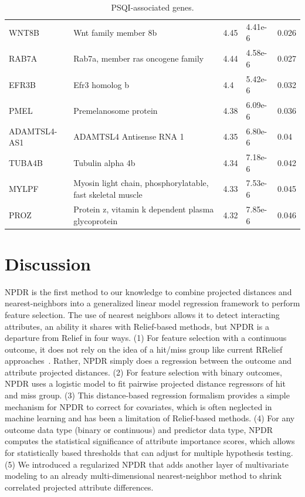 \documentclass[10pt]{article}
\begin{document}
\begin{table}[]
\begin{tabular}{p{1.8cm}p{6.8cm}C{1cm}C{1.3cm}C{1.7cm}}
WNT8B    & Wnt family member 8b                                       & 4.45          & 4.41e-6       & 0.026          \\
RAB7A    & Rab7a, member ras oncogene family                          & 4.44          & 4.58e-6       & 0.027          \\
EFR3B    & Efr3 homolog b                                             & 4.4           & 5.42e-6       & 0.032          \\
PMEL     & Premelanosome protein                                      & 4.38          & 6.09e-6       & 0.036          \\
ADAMTSL4-AS1 & ADAMTSL4 Antisense RNA 1 & 4.35 & 6.80e-6 &	0.04 \\
TUBA4B   & Tubulin alpha 4b                                           & 4.34          & 7.18e-6       & 0.042          \\
MYLPF    & Myosin light chain, phosphorylatable, fast skeletal muscle & 4.33          & 7.53e-6       & 0.045          \\
PROZ     & Protein z, vitamin k dependent plasma glycoprotein         & 4.32          & 7.85e-6       & 0.046          \\ 
\hline
\end{tabular}
\caption{PSQI-associated genes.}
\label{tab:psqi}
\end{table}

\section{Discussion}
NPDR is the first method to our knowledge to combine projected distances and nearest-neighbors into a generalized linear model regression framework to perform feature selection. The use of nearest neighbors allows it to detect interacting attributes, an ability it shares with Relief-based methods, but NPDR is a departure from Relief in four ways. (1) For feature selection with a continuous outcome, it does not rely on the idea of a hit/miss group like current RRelief approaches~\cite{urbanowicz17}. Rather, NPDR simply does a regression between the outcome and attribute projected distances. (2) For feature selection with binary outcomes, NPDR uses a logistic model to fit pairwise projected distance regressors of hit and miss group. (3) This distance-based regression formalism provides a simple mechanism for NPDR to correct for covariates, which is often neglected in machine learning and has been a limitation of Relief-based methods. (4) For any outcome data type (binary or continuous) and predictor data type, NPDR computes the statistical significance of attribute importance scores, which allows for statistically based thresholds that can adjust for multiple hypothesis testing. (5) We introduced a regularized NPDR that adds another layer of multivariate modeling to an already multi-dimensional nearest-neighbor method to shrink correlated projected attribute differences.  
\end{document}
